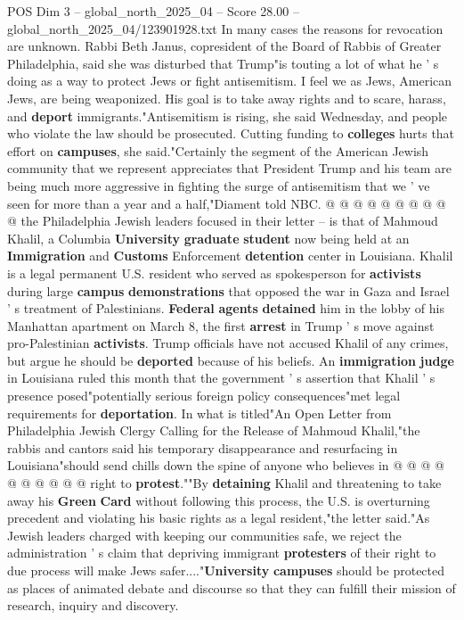 \begin{textsample}{POS Dim 3 – global\_north\_2025\_04 – Score 28.00 – global\_north\_2025\_04/123901928.txt}
In many cases the reasons for revocation are unknown.
Rabbi Beth Janus, copresident of the Board of Rabbis of Greater Philadelphia, said she was disturbed that Trump"is touting a lot of what he ' s doing as a way to protect Jews or fight antisemitism.
I feel we as Jews, American Jews, are being weaponized.
His goal is to take away rights and to scare, harass, and \textbf{deport} immigrants."Antisemitism is rising, she said Wednesday, and people who violate the law should be prosecuted.
Cutting funding to \textbf{colleges} hurts that effort on \textbf{campuses}, she said."Certainly the segment of the American Jewish community that we represent appreciates that President Trump and his team are being much more aggressive in fighting the surge of antisemitism that we ' ve seen for more than a year and a half,"Diament told NBC. @ @ @ @ @ @ @ @ @ @ the Philadelphia Jewish leaders focused in their letter -- is that of Mahmoud Khalil, a Columbia \textbf{University} \textbf{graduate} \textbf{student} now being held at an \textbf{Immigration} and \textbf{Customs} Enforcement \textbf{detention} center in Louisiana.
Khalil is a legal permanent U.S. resident who served as spokesperson for \textbf{activists} during large \textbf{campus} \textbf{demonstrations} that opposed the war in Gaza and Israel ' s treatment of Palestinians. \textbf{Federal} \textbf{agents} \textbf{detained} him in the lobby of his Manhattan apartment on March 8, the first \textbf{arrest} in Trump ' s move against pro-Palestinian \textbf{activists}.
Trump officials have not accused Khalil of any crimes, but argue he should be \textbf{deported} because of his beliefs.
An \textbf{immigration} \textbf{judge} in Louisiana ruled this month that the government ' s assertion that Khalil ' s presence posed"potentially serious foreign policy consequences"met legal requirements for \textbf{deportation}.
In what is titled"An Open Letter from Philadelphia Jewish Clergy Calling for the Release of Mahmoud Khalil,"the rabbis and cantors said his temporary disappearance and resurfacing in Louisiana"should send chills down the spine of anyone who believes in @ @ @ @ @ @ @ @ @ @ right to \textbf{protest}.""By \textbf{detaining} Khalil and threatening to take away his \textbf{Green} \textbf{Card} without following this process, the U.S. is overturning precedent and violating his basic rights as a legal resident,"the letter said."As Jewish leaders charged with keeping our communities safe, we reject the administration ' s claim that depriving immigrant \textbf{protesters} of their right to due process will make Jews safer...."\textbf{University} \textbf{campuses} should be protected as places of animated debate and discourse so that they can fulfill their mission of research, inquiry and discovery.

\end{textsample}
